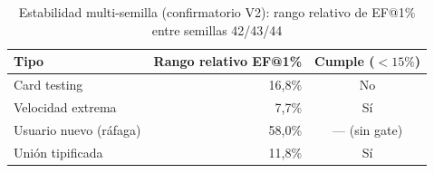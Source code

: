 \begin{table}[htbp]
\centering
\small
\caption{Estabilidad multi-semilla (confirmatorio V2): rango relativo de EF@1\% entre semillas 42/43/44}
\label{tab:v2-multiseed-stability}
\begin{tabular}{lrc}
\toprule
Tipo & Rango relativo EF@1\% & Cumple ($< 15\%$) \\
\midrule
  Card testing & 16,8\% & No \\
  Velocidad extrema & 7,7\% & Sí \\
  Usuario nuevo (ráfaga) & 58,0\% & --- (sin gate) \\
  Unión tipificada & 11,8\% & Sí \\
\bottomrule
\end{tabular}
\end{table}
